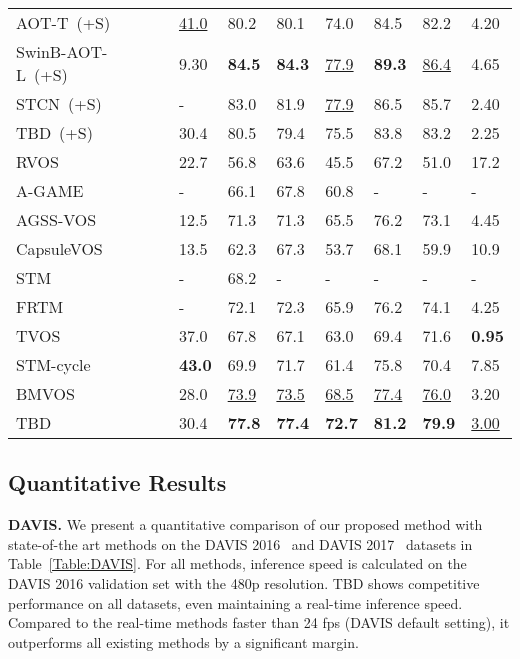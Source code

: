 \documentclass[runningheads]{llncs}
\begin{document}
\begin{table}[h!]
\begin{tabular}{lP{0.8cm}P{1cm}P{1cm}P{1cm}P{1cm}P{1cm}P{1cm}P{1cm}}
		AOT-T~(+S)~\cite{AOT} & &\underline{41.0} &80.2 &80.1 &74.0 &84.5 &82.2 &4.20\\
		SwinB-AOT-L~(+S)~\cite{AOT} & &9.30 &\textbf{84.5} &\textbf{84.3} &\underline{77.9} &\textbf{89.3} &\underline{86.4} &4.65\\
		STCN~(+S)~\cite{STCN} & &- &83.0 &81.9 &\underline{77.9} &86.5 &85.7 &2.40\\
		TBD~(+S) & &30.4 &80.5 &79.4 &75.5 &83.8 &83.2 &2.25\\
		\hline
		RVOS~\cite{RVOS} & &22.7 &56.8 &63.6 &45.5 &67.2 &51.0 &17.2\\
        A-GAME~\cite{A-GAME} & &- &66.1 &67.8 &60.8 &- &- &-\\
		AGSS-VOS~\cite{AGSS-VOS} & &12.5 &71.3 &71.3 &65.5 &76.2 &73.1 &4.45\\
		CapsuleVOS~\cite{CapsuleVOS} & &13.5 &62.3 &67.3 &53.7 &68.1 &59.9 &10.9\\
		STM~\cite{STM} & &- &68.2 &- &- &- &- &-\\
		FRTM~\cite{FRTM} &\checkmark &- &72.1 &72.3 &65.9 &76.2 &74.1 &4.25\\
		TVOS~\cite{TVOS} & &37.0 &67.8 &67.1 &63.0 &69.4 &71.6 &\textbf{0.95}\\
		STM-cycle~\cite{STM-cycle} & &\textbf{43.0} &69.9 &71.7 &61.4 &75.8 &70.4 &7.85\\
		BMVOS~\cite{BMVOS} & &28.0 &\underline{73.9} &\underline{73.5} &\underline{68.5} &\underline{77.4} &\underline{76.0} &3.20\\
		TBD & &30.4 &\textbf{77.8} &\textbf{77.4} &\textbf{72.7} &\textbf{81.2} &\textbf{79.9} &\underline{3.00}\\
		\hline
	\end{tabular}
	\label{Table:YTVOS}
\end{table}



\subsection{Quantitative Results}
\label{quantitative}
\noindent\textbf{DAVIS.} We present a quantitative comparison of our proposed method with state-of-the art methods on the DAVIS 2016~\cite{DAVIS2016} and DAVIS 2017~\cite{DAVIS2017} datasets in Table~\ref{Table:DAVIS}. For all methods, inference speed is calculated on the DAVIS 2016 validation set with the 480p resolution. TBD shows competitive performance on all datasets, even maintaining a real-time inference speed. Compared to the real-time methods faster than 24 fps (DAVIS default setting), it outperforms all existing methods by a significant margin.
\end{document}
